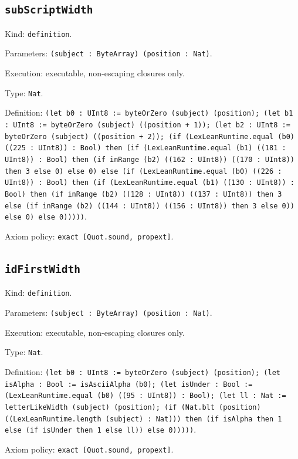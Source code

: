 \documentclass[11pt]{article}
\begin{document}
\subsection*{\texttt{subScriptWidth}}
\noindent Kind: \texttt{definition}.\par
\noindent Parameters: \texttt{(subject : ByteArray) (position : Nat)}.\par
\noindent Execution: executable, non-escaping closures only.\par
\noindent Type: \texttt{Nat}.\par
\noindent Definition: \texttt{(let b0 : UInt8 := byteOrZero (subject) (position); (let b1 : UInt8 := byteOrZero (subject) ((position + 1)); (let b2 : UInt8 := byteOrZero (subject) ((position + 2)); (if (LexLeanRuntime.equal (b0) ((225 : UInt8)) : Bool) then (if (LexLeanRuntime.equal (b1) ((181 : UInt8)) : Bool) then (if inRange (b2) ((162 : UInt8)) ((170 : UInt8)) then 3 else 0) else 0) else (if (LexLeanRuntime.equal (b0) ((226 : UInt8)) : Bool) then (if (LexLeanRuntime.equal (b1) ((130 : UInt8)) : Bool) then (if inRange (b2) ((128 : UInt8)) ((137 : UInt8)) then 3 else (if inRange (b2) ((144 : UInt8)) ((156 : UInt8)) then 3 else 0)) else 0) else 0)))))}.\par
\noindent Axiom policy: \texttt{exact [Quot.sound, propext]}.\par
\subsection*{\texttt{idFirstWidth}}
\noindent Kind: \texttt{definition}.\par
\noindent Parameters: \texttt{(subject : ByteArray) (position : Nat)}.\par
\noindent Execution: executable, non-escaping closures only.\par
\noindent Type: \texttt{Nat}.\par
\noindent Definition: \texttt{(let b0 : UInt8 := byteOrZero (subject) (position); (let isAlpha : Bool := isAsciiAlpha (b0); (let isUnder : Bool := (LexLeanRuntime.equal (b0) ((95 : UInt8)) : Bool); (let ll : Nat := letterLikeWidth (subject) (position); (if (Nat.blt (position) ((LexLeanRuntime.length (subject) : Nat))) then (if isAlpha then 1 else (if isUnder then 1 else ll)) else 0)))))}.\par
\noindent Axiom policy: \texttt{exact [Quot.sound, propext]}.\par
\end{document}

